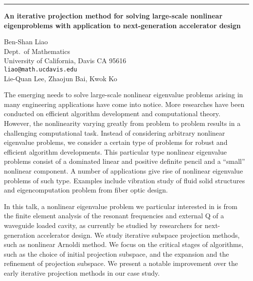 \documentclass[twosided]{report}
\begin{document}
	\begin{center} \rule{6in}{1pt} \end{center}

\begin{center}
{\large			%
{\bf An iterative projection method for solving large-scale nonlinear \\
eigenproblems with application to next-generation accelerator design}}

	Ben-Shan Liao \\
	Dept.~of Mathematics \\
	University of California, Davis CA 95616 \\
	{\tt liao@math.ucdavis.edu} \\
	Lie-Quan Lee, Zhaojun Bai, Kwok Ko
\end{center}
The emerging needs to solve large-scale nonlinear eigenvalue
problems arising in many engineering applications have come
into notice. More researches have been conducted on
efficient algorithm development and computational theory.
However, the nonlinearity varying greatly from problem to
problem results in a challenging computational task. Instead
of considering arbitrary nonlinear eigenvalue problems, we
consider a certain type of problems for robust and efficient
algorithm developments. This particular type nonlinear
eigenvalue problems consist of a dominated linear and
positive definite pencil and a ``small'' nonlinear component.
A number of applications give rise of nonlinear eigenvalue
problems of such type.  Examples include vibration study of
fluid solid structures and eigencomputation problem from
fiber optic design.

In this talk, a nonlinear eigenvalue problem we particular
interested in is from the finite element analysis of the
resonant frequencies and external Q of a waveguide loaded
cavity, as currently be studied by researchers for
next-generation accelerator design. We study iterative
subspace projection methods, such as nonlinear Arnoldi
method. We focus on the critical stages of algorithms, such
as the choice of initial projection subspace, and the
expansion and the refinement of projection subspace. We
present a notable improvement over the early iterative
projection methods in our case study.
\end{document}
